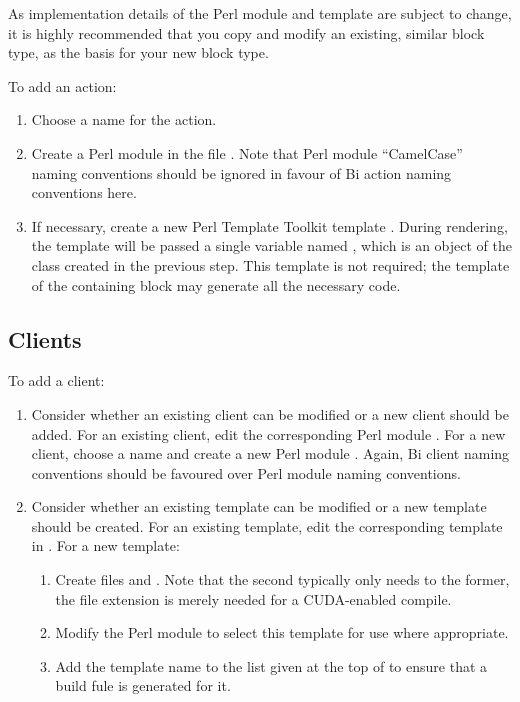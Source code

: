 As implementation details of the Perl module and template are subject to
change, it is highly recommended that you copy and modify an existing, similar
block type, as the basis for your new block type.

To add an action:
\begin{enumerate}
\item Choose a name for the action.
\item Create a Perl module  in the
  file . Note that Perl module
  ``CamelCase'' naming conventions should be ignored in favour of Bi action
  naming conventions here.
\item If necessary, create a new Perl Template Toolkit template
  . During rendering, the
  template will be passed a single variable named , which is an
  object of the class created in the previous step. This template is
  not required; the template of the containing block may generate all the
  necessary code.
\end{enumerate}

\subsection{Clients}

To add a client:
\begin{enumerate}
\item Consider whether an existing client can be modified or a new client
  should be added. For an existing client, edit the corresponding Perl module
  . For a new client, choose a name
  and create a new Perl module . Again,
  Bi client naming conventions should be favoured over Perl module naming
  conventions.
\item Consider whether an existing template can be modified or a new template
  should be created. For an existing template, edit the corresponding template
  in . For a new template:
\begin{enumerate}
\item Create files  and
  . Note that the second
  typically only needs to  the former, the 
  file extension is merely needed for a CUDA-enabled compile.
\item Modify the Perl module to select this template for use where
  appropriate.
\item Add the template name to the list given at the top of
   to ensure that a build fule is generated
  for it.
\end{enumerate}
\end{enumerate}

